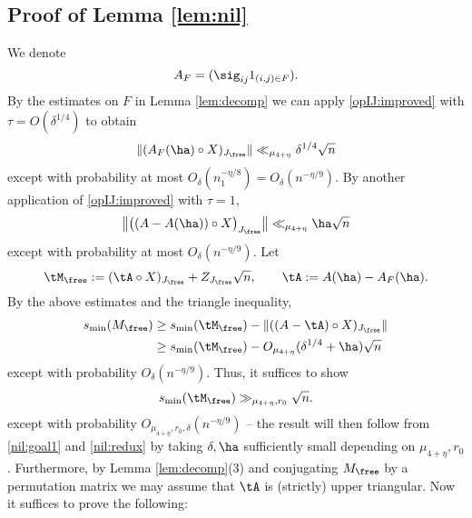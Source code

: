 \documentclass[aop,preprint]{imsart}
\theoremstyle{plain}
\theoremstyle{definition}
\theoremstyle{remark}
\numberwithin{equation}{section}
\numberwithin{theorem}{section}
\begin{document}
\subsection{Proof of Lemma \ref{lem:nil}}		\label{sec:nil}

We denote
\begin{equation}
A_{F}= (\sig_{ij} 1_{(i,j)\in F}).
\end{equation}
%
By the estimates on $F$ in Lemma \ref{lem:decomp} we can apply \eqref{opIJ:improved} with $\tau=O(\delta^{1/4})$ to obtain
\begin{equation}
\|(A_{F}(\ha)\circ X)_{J_{\free}}\| \ll_{\mu_{4+\eta}} \delta^{1/4}\sqrt{n}
\end{equation}
%
except with probability at most $O_{\delta}(n_1^{-\eta/8}) = O_{\delta}(n^{-\eta/9})$.
By another application of \eqref{opIJ:improved} with $\tau=1$, 
\begin{equation}
\big\|\big((A-A(\ha))\circ X\big)_{J_{\free}}\big\| \ll_{\mu_{4+\eta}} \ha\sqrt{n}
\end{equation}
except with probability at most $O_{\delta}(n^{-\eta/9})$. 
Let
\begin{equation}
\tM_{\free} := (\tA\circ X)_{J_{\free}} + Z_{J_{\free}}\sqrt{n}, \quad\quad \tA := A(\ha)-A_{F}(\ha).
\end{equation}
%
By the above estimates and the triangle inequality,
\begin{align}
s_{\min}(M_{\free}) &\ge s_{\min}(\tM_{\free}) - \|((A-\tA)\circ X)_{J_{\free}}\| \notag\\
&\ge s_{\min}(\tM_{\free})- O_{\mu_{4+\eta}}(\delta^{1/4}+ \ha)\sqrt{n}	\label{nil:redux}
\end{align}
except with probability $O_{\delta}(n^{-\eta/9})$. 
Thus, it suffices to show 
\begin{equation}	\label{nil:goal1}
s_{\min}(\tM_{\free})\gg_{\mu_{4+\eta},r_0}\sqrt{n}.
\end{equation}
except with probability $O_{\mu_{4+\eta},r_0,\delta}(n^{-\eta/9})$ -- the result will then follow from \eqref{nil:goal1} and \eqref{nil:redux} by taking $\delta,\ha$ sufficiently small depending on $\mu_{4+\eta},r_0$.
Furthermore, by Lemma \ref{lem:decomp}(3) and conjugating $M_{\free}$ by a permutation matrix we may assume that $\tA$ is (strictly) upper triangular. 
Now it suffices to prove the following:
\end{document}

